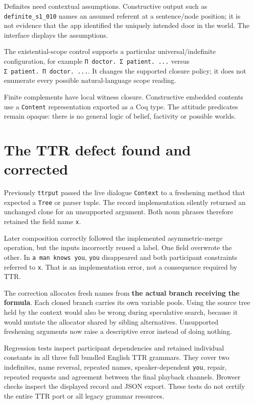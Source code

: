 \documentclass[11pt,a4paper]{article}
\begin{document}
Definites need contextual assumptions. Constructive output such as
\texttt{definite\_s1\_010} names an assumed referent at a sentence/node
position; it is not evidence that the app identified the uniquely
intended door in the world. The interface displays the assumptions.

The existential-scope control supports a particular universal/indefinite
configuration, for example \texttt{Π\ doctor.\ Σ\ patient.\ ...} versus
\texttt{Σ\ patient.\ Π\ doctor.\ ...}. It changes the supported closure
policy; it does not enumerate every possible natural-language scope
reading.

Finite complements have local witness closure. Constructive embedded
contents use a \texttt{Content} representation exported as a Coq type.
The attitude predicates remain opaque: there is no general logic of
belief, factivity or possible worlds.

\section{The TTR defect found and
corrected}\label{the-ttr-defect-found-and-corrected}

Previously \texttt{ttrput} passed the live dialogue \texttt{Context} to
a freshening method that expected a \texttt{Tree} or parser tuple. The
record implementation silently returned an unchanged clone for an
unsupported argument. Both noun phrases therefore retained the field
name \texttt{x}.

Later composition correctly followed the implemented asymmetric-merge
operation, but the inputs incorrectly reused a label. One field
overwrote the other. In \texttt{a\ man\ knows\ you}, \texttt{you}
disappeared and both participant constraints referred to \texttt{x}.
That is an implementation error, not a consequence required by TTR.

The correction allocates fresh names from \textbf{the actual branch
receiving the formula}. Each cloned branch carries its own variable
pools. Using the source tree held by the context would also be wrong
during speculative search, because it would mutate the allocator shared
by sibling alternatives. Unsupported freshening arguments now raise a
descriptive error instead of doing nothing.

Regression tests inspect participant dependencies and retained
individual constants in all three full bundled English TTR grammars.
They cover two indefinites, name reversal, repeated names,
speaker-dependent \texttt{you}, repair, repeated requests and agreement
between the final playback channels. Browser checks inspect the
displayed record and JSON export. These tests do not certify the entire
TTR port or all legacy grammar resources.
\end{document}
